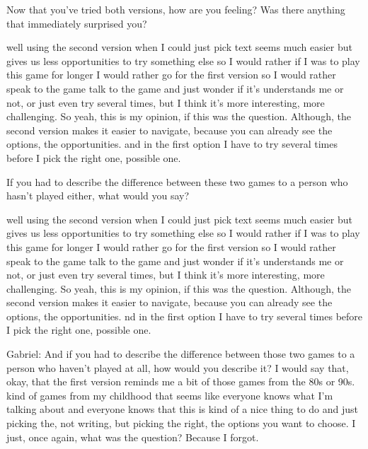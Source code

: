 \begin{QandA}
   \item Now that you’ve tried both versions, how are you feeling? Was there anything that immediately surprised you?
         \begin{answered}
               well using the second version when I could just pick text seems much easier but gives us less opportunities to try something else so I would rather if I was to play this game for longer I would rather go for the first version so I would rather speak to the game talk to the game and just wonder if it's
               understands me or not, or just even try several times, but I think it's more interesting, more challenging.
               So yeah, this is my opinion, if this was the question.
               Although, the second version makes it easier to navigate, because you can already see the options, the opportunities.
               and in the first option I have to try several times before I pick the right one, possible one.
            \end{answered}

   \item If you had to describe the difference between these two games to a person who hasn't played either, what would you say?
         \begin{answered}
               well using the second version when I could just pick text seems much easier but gives us less opportunities to try something else so I would rather if I was to play this game for longer I would rather go for the first version so I would rather speak to the game talk to the game and just wonder if it's
               understands me or not, or just even try several times, but I think it's more interesting, more challenging.
               So yeah, this is my opinion, if this was the question.
               Although, the second version makes it easier to navigate, because you can already see the options, the opportunities.
                nd in the first option I have to try several times before I pick the right one, possible one.


               Gabriel: And if you had to describe the difference between those two games to a person who haven't played at all, how would you describe it?
               I would say that, okay, that the first version reminds me a bit of those games from the 80s or 90s.
                kind of games from my childhood that seems like everyone knows what I'm talking about and everyone knows that this is kind of a nice thing to do and just picking the, not writing, but picking the right, the options you want to choose.
               I just, once again, what was the question?
               Because I forgot.



\end{answered}
\end{QandA}
